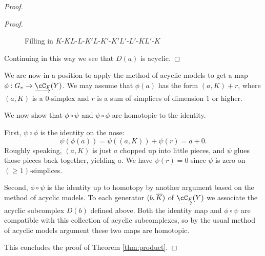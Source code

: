 \begin{proof}
\begin{proof}
\begin{figure}[t] \centering
{}
\caption{Filling in $K$-$KL$-$L$-$K'L$-$K'$-$K'L'$-$L'$-$KL'$-$K$}
\label{zzz5}
\end{figure}

Continuing in this way we see that $D(a)$ is acyclic.
\end{proof}

We are now in a position to apply the method of acyclic models to get a map
$\phi:G_* \to \cl{\cC_F}(Y)$.
We may assume that $\phi(a)$ has the form $(a, K) + r$, where $(a, K)$ is a 0-simplex
and $r$ is a sum of simplices of dimension 1 or higher.

We now show that $\phi\circ\psi$ and $\psi\circ\phi$ are homotopic to the identity.

First, $\psi\circ\phi$ is the identity on the nose:
\[
	\psi(\phi(a)) = \psi((a,K)) + \psi(r) = a + 0.
\]
Roughly speaking, $(a, K)$ is just $a$ chopped up into little pieces, and 
$\psi$ glues those pieces back together, yielding $a$.
We have $\psi(r) = 0$ since $\psi$ is zero on $(\ge 1)$-simplices.
 
Second, $\phi\circ\psi$ is the identity up to homotopy by another argument based on the method of acyclic models.
To each generator $(b, \overline{K})$ of $\cl{\cC_F}(Y)$ we associate the acyclic subcomplex $D(b)$ defined above.
Both the identity map and $\phi\circ\psi$ are compatible with this
collection of acyclic subcomplexes, so by the usual method of acyclic models argument these two maps
are homotopic.

This concludes the proof of Theorem \ref{thm:product}.
\end{proof}

